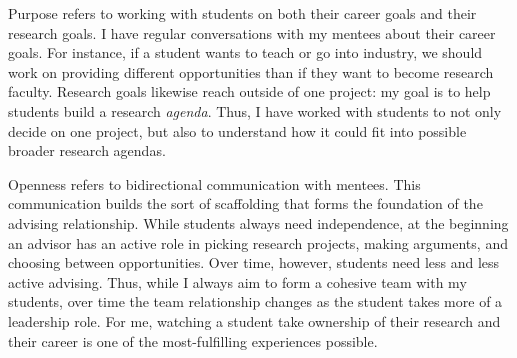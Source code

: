 \documentclass{article}
\theoremstyle{definition}
\begin{document}
Purpose refers to working with students on both their career goals and their research goals.
I have regular conversations with my mentees about their career goals.
For instance, if a student wants to teach or go into industry, we should work on providing different opportunities than if they want to become research faculty.
Research goals likewise reach outside of one project: my goal is to help students build a research \emph{agenda}.
Thus, I have worked with students to not only decide on one project, but also to understand how it could fit into possible broader research agendas.

Openness refers to bidirectional communication with mentees.
This communication builds the sort of scaffolding that forms the foundation of the advising relationship.
While students always need independence, at the beginning an advisor has an active role in picking research projects, making arguments, and choosing between opportunities.
Over time, however, students need less and less active advising.
Thus, while I always aim to form a cohesive team with my students, over time the team relationship changes as the student takes more of a leadership role.
For me, watching a student take ownership of their research and their career is one of the most-fulfilling experiences possible.
\end{document}
